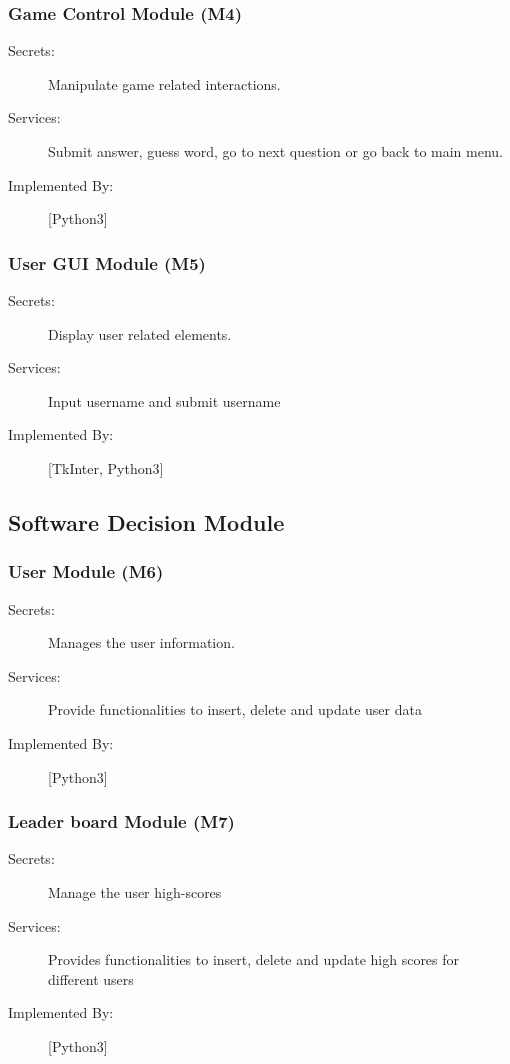 \documentclass[12pt, titlepage]{article}
\begin{document}
\subsubsection{Game Control Module (M4)}

\begin{description}
\item[Secrets:]Manipulate game related interactions.
\item[Services:]Submit answer, guess word, go to next question or go back to main menu. 
\item[Implemented By:] [Python3]
\end{description}

\subsubsection{User GUI Module (M5)}

\begin{description}
\item[Secrets:]Display user related elements.
\item[Services:]Input username and submit username
\item[Implemented By:] [TkInter, Python3]
\end{description}

\subsection{Software Decision Module}

\subsubsection{User Module (M6)}

\begin{description}
\item[Secrets:]Manages the user information.
\item[Services:]Provide functionalities to insert, delete and update user data
\item[Implemented By:] [Python3]
\end{description}

\subsubsection{Leader board Module (M7)}

\begin{description}
\item[Secrets:]Manage the user high-scores
\item[Services:]Provides functionalities to insert, delete and update high scores for different users
\item[Implemented By:] [Python3]
\end{description}
\end{document}
